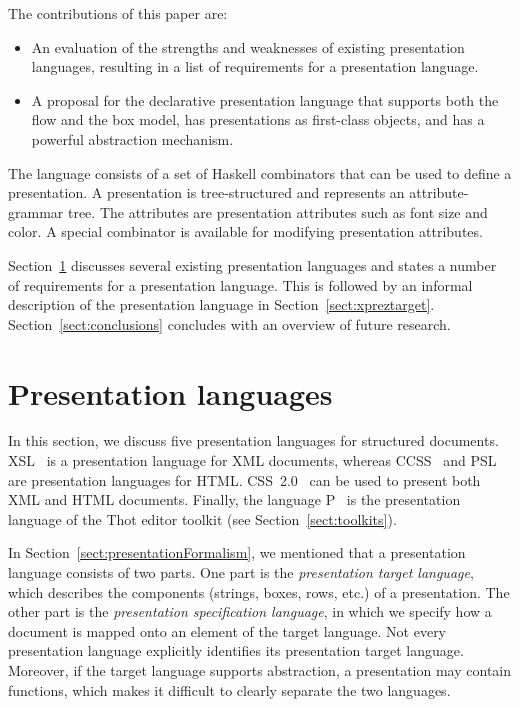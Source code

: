 \begin{center}
 \qquad
{}
\end{center}


\bc
The contributions of this paper are:

\begin{itemize}
\item An evaluation of the strengths and weaknesses of existing presentation languages, resulting in a list of requirements for a presentation language.
\item A proposal for the declarative presentation language {\Xprez} that supports both the flow and the box model, has presentations as first-class objects, and has a powerful abstraction mechanism.
\end{itemize}
\ec

The {\Xprez} language consists of a set of Haskell combinators that can be used to define a presentation. A presentation is tree-structured and represents an attribute-grammar tree. The attributes are presentation attributes such as font size and color. A special combinator is available for modifying presentation attributes. 

Section~\ref{sect:targetlangs} discusses several existing presentation languages and states a number of requirements for a presentation language. This is followed by an informal description of the {\Xprez} presentation language in Section~\ref{sect:xpreztarget}. Section~\ref{sect:conclusions} concludes with an overview of future research.


%																
%																
%																
\section{Presentation languages} \label{sect:targetlangs}

In this section, we discuss five presentation languages for structured documents. XSL~\cite{xsl10} is a presentation language for XML documents, whereas CCSS~\cite{badros99ccss} and PSL~\cite{marden98psl} are presentation languages for HTML. CSS~2.0~\cite{css2} can be used to present both XML and HTML documents. Finally, the language P~\cite{quint97thot} is the presentation language of the Thot editor toolkit (see Section~\ref{sect:toolkits}). 

In Section~\ref{sect:presentationFormalism}, we mentioned that a presentation language consists of two parts. One part is the {\em presentation target language}, which describes the components (strings, boxes, rows, etc.) of a presentation. The other part is the {\em presentation specification language}, in which we specify how a document is mapped onto an element of the target language. Not every presentation language explicitly identifies its presentation target language. Moreover, if the target language supports abstraction, a presentation may contain functions, which makes it difficult to clearly separate the two languages.


